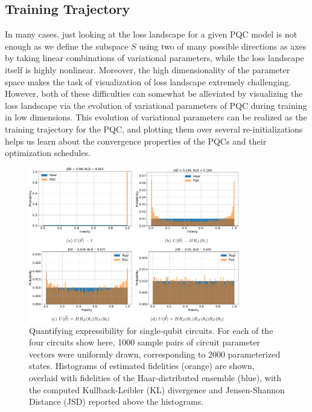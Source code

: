 \documentclass[%
 reprint,
 amsmath,
 amssymb,
 showkeys,
 pra,
 floatfix,
]{revtex4-2}
\begin{document}
\subsection{Training Trajectory}

In many cases, just looking at the loss landscape for a given PQC model is not enough as we define the subspace $S$ using two of many possible directions as axes by taking linear combinations of variational parameters, while the loss landscape itself is highly nonlinear. Moreover, the high dimensionality of the parameter space makes the task of visualization of loss landscape extremely challenging. However, both of these difficulties can somewhat be alleviated by visualizing the loss landscape via the evolution of variational parameters of PQC during training in low dimensions. This evolution of variational parameters can be realized as the training trajectory for the PQC, and plotting them over several re-initializations helps us learn about the convergence properties of the PQCs and their optimization schedules. 

\begin{figure}[!tp]
    \centering
    \includegraphics[width=0.82\textwidth]{images/expressibility.pdf}
    \caption[Quantifying expressibility for single-qubit circuits]{Quantifying expressibility for single-qubit circuits. For each of the four circuits show here, 1000 sample pairs of circuit parameter vectors were uniformly drawn, corresponding to 2000 parameterized states. Histograms of estimated fidelities (orange) are shown, overlaid with fidelities of the Haar-distributed ensemble (blue), with the computed Kullback-Leibler (KL) divergence and Jensen-Shannon Distance (JSD) reported above the histograms.}
    \label{fig:expressibility}
\end{figure}
\end{document}
